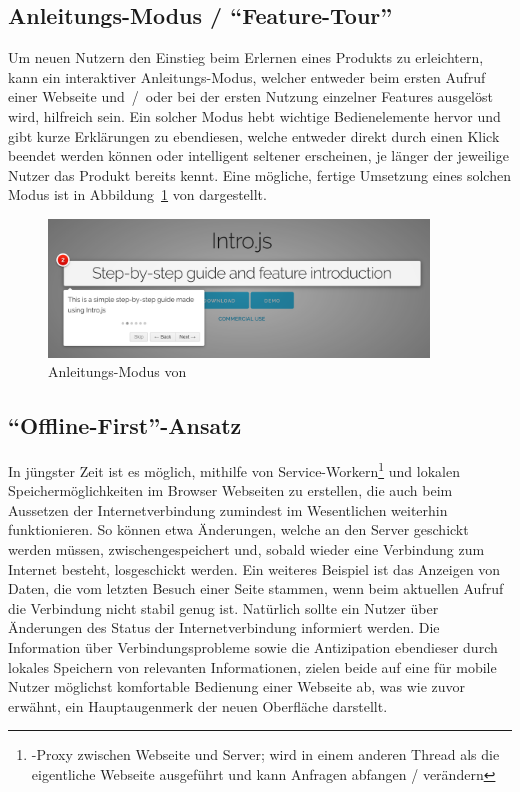 \subsection{Anleitungs-Modus / \enquote{Feature-Tour}}
 Um neuen Nutzern den Einstieg beim Erlernen eines Produkts zu erleichtern, kann ein interaktiver Anleitungs-Modus, welcher entweder beim ersten Aufruf einer Webseite und~/~oder bei der ersten Nutzung einzelner Features ausgelöst wird, hilfreich sein. Ein solcher Modus hebt wichtige Bedienelemente hervor und gibt kurze Erklärungen zu ebendiesen, welche entweder direkt durch einen Klick beendet werden können oder intelligent seltener erscheinen, je länger der jeweilige Nutzer das Produkt bereits kennt. Eine mögliche, fertige Umsetzung eines solchen Modus ist in Abbildung~\ref{fig:intro_js_example} von  dargestellt.

 \begin{figure}[hb]
    \centering
    \captionsetup{justification=centering}
    \includegraphics[width=0.9\textwidth]{figures/intro_js_example.png}
        \caption{Anleitungs-Modus von  \parencite{mehrabani}}\label{fig:intro_js_example}
\end{figure}

\subsection{\enquote{Offline-First}-Ansatz}
In jüngster Zeit ist es möglich, mithilfe von Service-Workern\footnote{-Proxy zwischen Webseite und Server; wird in einem anderen Thread als die eigentliche Webseite ausgeführt und kann Anfragen abfangen / verändern} und lokalen Speichermöglichkeiten im Browser Webseiten zu erstellen, die auch beim Aussetzen der Internetverbindung zumindest im Wesentlichen weiterhin funktionieren. So können etwa Änderungen, welche an den Server geschickt werden müssen, zwischengespeichert und, sobald wieder eine Verbindung zum Internet besteht, losgeschickt werden. Ein weiteres Beispiel ist das Anzeigen von Daten, die vom letzten Besuch einer Seite stammen, wenn beim aktuellen Aufruf die Verbindung nicht stabil genug ist. Natürlich sollte ein Nutzer über Änderungen des Status der Internetverbindung informiert werden.
Die Information über Verbindungsprobleme sowie die Antizipation ebendieser durch lokales Speichern von relevanten Informationen, zielen beide auf eine für mobile Nutzer möglichst komfortable Bedienung einer Webseite ab, was wie zuvor erwähnt, ein Hauptaugenmerk der neuen Oberfläche darstellt.


